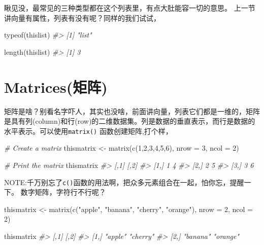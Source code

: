 \documentclass[
]{book}
\newenvironment{Shaded}{\begin{snugshade}}{\end{snugshade}}
\newcommand{\AttributeTok}[1]{\textcolor[rgb]{0.77,0.63,0.00}{#1}}
\newcommand{\CommentTok}[1]{\textcolor[rgb]{0.56,0.35,0.01}{\textit{#1}}}
\newcommand{\DecValTok}[1]{\textcolor[rgb]{0.00,0.00,0.81}{#1}}
\newcommand{\FunctionTok}[1]{\textcolor[rgb]{0.00,0.00,0.00}{#1}}
\newcommand{\NormalTok}[1]{#1}
\newcommand{\OtherTok}[1]{\textcolor[rgb]{0.56,0.35,0.01}{#1}}
\newcommand{\StringTok}[1]{\textcolor[rgb]{0.31,0.60,0.02}{#1}}
\begin{document}
瞅见没，最常见的三种类型都在这个列表里，有点大肚能容一切的意思。
上一节讲向量有属性，列表有没有呢？同样的我们试试，

\begin{Shaded}
\begin{Highlighting}[]
\FunctionTok{typeof}\NormalTok{(thislist)}
\CommentTok{\#\textgreater{} [1] "list"}
\end{Highlighting}
\end{Shaded}

\begin{Shaded}
\begin{Highlighting}[]
\FunctionTok{length}\NormalTok{(thislist)}
\CommentTok{\#\textgreater{} [1] 3}
\end{Highlighting}
\end{Shaded}

\hypertarget{matricesux77e9ux9635}{%
\section{Matrices(矩阵)}\label{matricesux77e9ux9635}}

矩阵是啥？别看名字吓人，其实也没啥，前面讲向量，列表它们都是一维的，矩阵是具有列(column)和行(row)的二维数据集。列是数据的垂直表示，而行是数据的水平表示。可以使用\texttt{matrix()} 函数创建矩阵,打个样，

\begin{Shaded}
\begin{Highlighting}[]
\CommentTok{\# Create a matrix}
\NormalTok{thismatrix }\OtherTok{\textless{}{-}} \FunctionTok{matrix}\NormalTok{(}\FunctionTok{c}\NormalTok{(}\DecValTok{1}\NormalTok{,}\DecValTok{2}\NormalTok{,}\DecValTok{3}\NormalTok{,}\DecValTok{4}\NormalTok{,}\DecValTok{5}\NormalTok{,}\DecValTok{6}\NormalTok{), }\AttributeTok{nrow =} \DecValTok{3}\NormalTok{, }\AttributeTok{ncol =} \DecValTok{2}\NormalTok{)}

\CommentTok{\# Print the matrix}
\NormalTok{thismatrix}
\CommentTok{\#\textgreater{}      [,1] [,2]}
\CommentTok{\#\textgreater{} [1,]    1    4}
\CommentTok{\#\textgreater{} [2,]    2    5}
\CommentTok{\#\textgreater{} [3,]    3    6}
\end{Highlighting}
\end{Shaded}

NOTE:千万别忘了\texttt{c()}函数的用法啊，把众多元素组合在一起，怕你忘，提醒一下。
数字矩阵，字符行不行呢？

\begin{Shaded}
\begin{Highlighting}[]
\NormalTok{thismatrix }\OtherTok{\textless{}{-}} \FunctionTok{matrix}\NormalTok{(}\FunctionTok{c}\NormalTok{(}\StringTok{"apple"}\NormalTok{, }\StringTok{"banana"}\NormalTok{, }\StringTok{"cherry"}\NormalTok{, }\StringTok{"orange"}\NormalTok{), }\AttributeTok{nrow =} \DecValTok{2}\NormalTok{, }\AttributeTok{ncol =} \DecValTok{2}\NormalTok{)}

\NormalTok{thismatrix}
\CommentTok{\#\textgreater{}      [,1]     [,2]    }
\CommentTok{\#\textgreater{} [1,] "apple"  "cherry"}
\CommentTok{\#\textgreater{} [2,] "banana" "orange"}
\end{Highlighting}
\end{Shaded}
\end{document}
